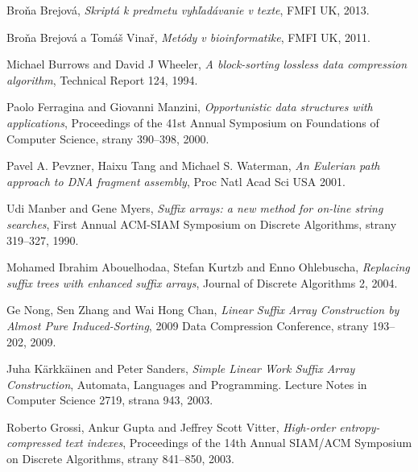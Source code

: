 \begin{thebibliography}{99}
 
        Broňa Brejová,
        \emph{Skriptá k predmetu vyhľadávanie v texte},
        FMFI UK,
        2013.
        
        Broňa Brejová a Tomáš Vinař,
        \emph{Metódy v bioinformatike},
        FMFI UK,
        2011.
        
        Michael Burrows and David J Wheeler,
        \emph{A block-sorting lossless data compression algorithm},     
        Technical Report 124,
        1994.
        
        Paolo Ferragina and Giovanni Manzini,
        \emph{Opportunistic data structures with applications},
        Proceedings of the 41st Annual Symposium on Foundations of Computer
        Science, strany 390--398,
        2000.
        
        Pavel A. Pevzner, Haixu Tang and Michael S. Waterman,
        \emph{An Eulerian path approach to DNA fragment assembly},
        Proc Natl Acad Sci USA
        2001.
        
        Udi Manber and Gene Myers,
        \emph{Suffix arrays: a new method for on-line string searches},
        First Annual ACM-SIAM Symposium on Discrete Algorithms, strany 319--327,
        1990.
        
        Mohamed Ibrahim Abouelhodaa, Stefan Kurtzb and Enno Ohlebuscha,
        \emph{Replacing suffix trees with enhanced suffix arrays},
        Journal of Discrete Algorithms 2,
        2004.
        
        Ge Nong, Sen Zhang and Wai Hong Chan,
        \emph{Linear Suffix Array Construction by Almost Pure Induced-Sorting},
        2009 Data Compression Conference, strany 193--202,
        2009.
        
        Juha Kärkkäinen and Peter Sanders,
        \emph{Simple Linear Work Suffix Array Construction},
        Automata, Languages and Programming. Lecture Notes in Computer Science
        2719, strana 943,
        2003.
        
        Roberto Grossi, Ankur Gupta and Jeffrey Scott Vitter,
        \emph{High-order entropy-compressed text indexes},
        Proceedings of the 14th Annual SIAM/ACM Symposium on Discrete Algorithms, strany 841--850,
        2003.
        

\end{thebibliography}
